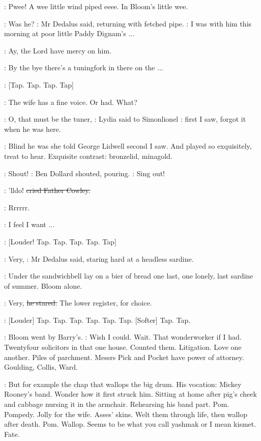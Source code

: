 :
Pwee!
A wee little wind piped eeee.
In Bloom's little wee.

\simon:
Was he?
:
Mr Dedalus said,
returning with fetched pipe.
\simon:
I was with him this morning at poor little Paddy Dignam's ...

\cowley:
Ay,
the Lord have mercy on him.

\simon:
By the bye there's a tuningfork in there on the ...

\stripling:
[Tap.
Tap.
Tap.
Tap]

\lidwell:
The wife has a fine voice.
Or had.
What?

\MissD:
O,
that must be the tuner,
:
Lydia said to Simonlionel
\MissD:
first I saw,
forgot
it when he was here.

:
Blind he was she told George Lidwell second I saw.
And played so
exquisitely,
treat to hear.
Exquisite contrast:
bronzelid,
minagold.

\dollard:
Shout!
:
Ben Dollard shouted,
pouring.
\dollard:
Sing out!

\cowley:
'lldo!
\sout{cried Father Cowley.}

:
Rrrrrr.

\BloomInt:
I feel I want ...

\stripling:
[Louder!
Tap.
Tap.
Tap.
Tap.
Tap]

\simon:
Very,
:
Mr Dedalus said,
staring hard at a headless sardine.

:
Under the sandwichbell
lay on a bier of bread one last,
one lonely,
last
sardine of summer.
Bloom alone.

\simon:
Very,
\sout{he stared.}
The lower register,
for choice.

\stripling:
[Louder] Tap.
Tap.
Tap.
Tap.
Tap.
Tap.
[Softer] Tap.
Tap.

:
Bloom went by Barry's.
\BloomInt:
Wish I could.
Wait.
That wonderworker if I
had.
Twentyfour solicitors in that one house.
Counted them.
Litigation.
Love one another.
Piles of parchment.
Messrs Pick and Pocket have power
of attorney.
Goulding,
Collis,
Ward.

\BloomInt:
But for example the chap that wallops the big drum.
His vocation:
Mickey Rooney's band.
Wonder how it first struck him.
Sitting at home
after pig's cheek and cabbage nursing it in the armchair.
Rehearsing his
band part.
Pom.
Pompedy.
Jolly for the wife.
Asses' skins.
Welt them
through life,
then wallop after death.
Pom.
Wallop.
Seems to be what you
call yashmak or I mean kismet.
Fate.

